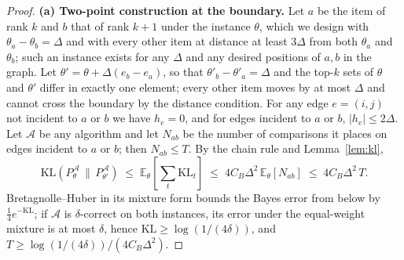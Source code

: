 \documentclass[11pt]{article}
\theoremstyle{definition}
\newcommand{\E}{\mathbb{E}}
\newcommand{\KL}{\mathrm{KL}}
\begin{document}
\begin{proof}
\textbf{(a) Two-point construction at the boundary.}  Let $a$ be the item of rank $k$ and $b$ that of rank $k+1$ under the instance $\theta$, which we design with $\theta_a-\theta_b=\Delta$ and with every other item at distance at least $3\Delta$ from both $\theta_a$ and $\theta_b$; such an instance exists for any $\Delta$ and any desired positions of $a,b$ in the graph.  Let $\theta'=\theta+\Delta(e_b-e_a)$, so that $\theta'_b-\theta'_a=\Delta$ and the top-$k$ sets of $\theta$ and $\theta'$ differ in exactly one element; every other item moves by at most $\Delta$ and cannot cross the boundary by the distance condition.  For any edge $e=(i,j)$ not incident to $a$ or $b$ we have $h_e=0$, and for edges incident to $a$ or $b$, $|h_e|\le 2\Delta$.  Let $\mathcal A$ be any algorithm and let $N_{ab}$ be the number of comparisons it places on edges incident to $a$ or $b$; then $N_{ab}\le T$.  By the chain rule and Lemma~\ref{lem:kl},
\[
\KL\!\left(P_\theta^{\mathcal A}\,\Big\|\,P_{\theta'}^{\mathcal A}\right)
\;\le\; \E_\theta\!\left[\textstyle\sum_t \KL_t\right]
\;\le\; 4C_B\Delta^2\,\E_\theta[N_{ab}]
\;\le\; 4C_B\Delta^2\,T .
\]
Bretagnolle--Huber in its mixture form bounds the Bayes error from below by $\tfrac14 e^{-\KL}$; if $\mathcal A$ is $\delta$-correct on both instances, its error under the equal-weight mixture is at most $\delta$, hence $\KL\ge \log(1/(4\delta))$, and $T\ge \log(1/(4\delta))/(4C_B\Delta^2)$.


\end{proof}
\end{document}
